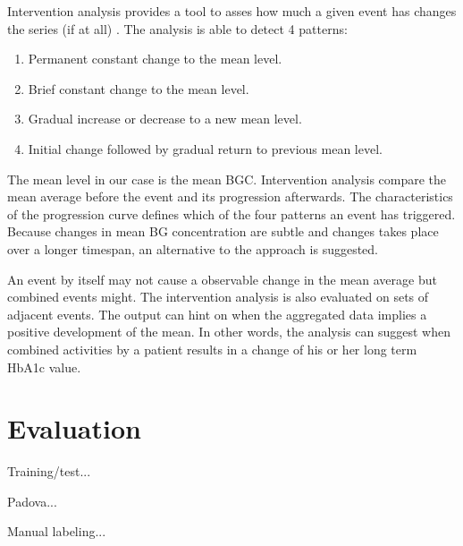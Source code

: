 Intervention analysis provides a tool to asses how much a given event has changes the series (if at all) \parencite{box2015time}.
The analysis is able to detect 4 patterns:

\begin{enumerate}
  \item Permanent constant change to the mean level.
  \item Brief constant change to the mean level.
  \item Gradual increase or decrease to a new mean level.
  \item Initial change followed by gradual return to previous mean level.
\end{enumerate}

The mean level in our case is the mean BGC.
Intervention analysis compare the mean average before the event and its progression afterwards.
The characteristics of the progression curve defines which of the four patterns an event has triggered.
Because changes in mean BG concentration are subtle and changes takes place over a longer timespan, an alternative to the approach is suggested.

An event by itself may not cause a observable change in the mean average but combined events might.
The intervention analysis is also evaluated on sets of adjacent events.
The output can hint on when the aggregated data implies a positive development of the mean.
In other words, the analysis can suggest when combined activities by a patient results in a change of his or her long term HbA1c value.

\section{Evaluation}

Training/test...

Padova...

Manual labeling...
